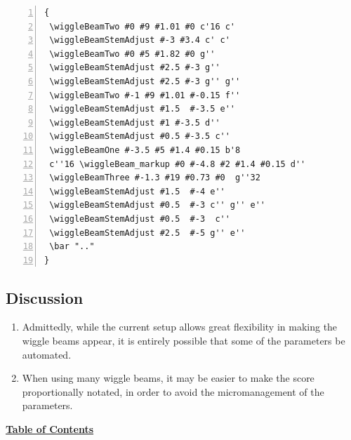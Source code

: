 \begin{Verbatim}[numbers=left,xleftmargin=5mm]
{
 \wiggleBeamTwo #0 #9 #1.01 #0 c'16 c'
 \wiggleBeamStemAdjust #-3 #3.4 c' c'
 \wiggleBeamTwo #0 #5 #1.82 #0 g''
 \wiggleBeamStemAdjust #2.5 #-3 g''
 \wiggleBeamStemAdjust #2.5 #-3 g'' g''
 \wiggleBeamTwo #-1 #9 #1.01 #-0.15 f''
 \wiggleBeamStemAdjust #1.5  #-3.5 e''
 \wiggleBeamStemAdjust #1 #-3.5 d''
 \wiggleBeamStemAdjust #0.5 #-3.5 c''
 \wiggleBeamOne #-3.5 #5 #1.4 #0.15 b'8
 c''16 \wiggleBeam_markup #0 #-4.8 #2 #1.4 #0.15 d''
 \wiggleBeamThree #-1.3 #19 #0.73 #0  g''32
 \wiggleBeamStemAdjust #1.5  #-4 e''
 \wiggleBeamStemAdjust #0.5  #-3 c'' g'' e''
 \wiggleBeamStemAdjust #0.5  #-3  c''
 \wiggleBeamStemAdjust #2.5  #-5 g'' e''
 \bar ".."
}
\end{Verbatim}

\subsection{Discussion}
\begin{enumerate}
\item Admittedly, while the current setup allows great flexibility in making the wiggle beams appear, it is entirely possible that some of the parameters be automated. 
\item When using many wiggle beams, it may be easier to make the score proportionally notated, in order to avoid the micromanagement of the parameters. 
\end{enumerate}
\hyperref[sec:toc]{\textbf{Table of Contents}}

